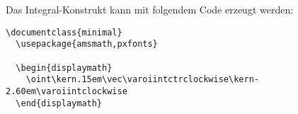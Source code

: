 % 

Das Integral-Konstrukt kann mit folgendem Code erzeugt werden:                                                                                                                                                                                                                                                                 
\begin{lstlisting}                                                                                                                                                                                                                                                                                                             
\documentclass{minimal}                                                                                                                                                                                                                                                                                                        
  \usepackage{amsmath,pxfonts}                                                                                                                                                                                                                                                                                                 
                                                                                                                                                                                                                                                                                                               
  \begin{displaymath}                                                                                                                                                                                                                                                                                                          
    \oint\kern.15em\vec\varoiintctrclockwise\kern-2.60em\varoiintclockwise                                                                                                                                                                                                                                                     
  \end{displaymath}                                                                                                                                                                                                                                                                                                            
                                                                                                                                                                                                                                                                                                                 
\end{lstlisting}